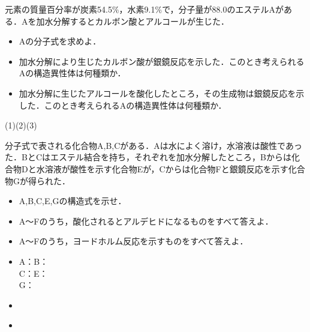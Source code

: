 \documentclass[a4paper,12pt]{ltjsreport}
\begin{document}
\newpage
\begin{que}
元素の質量百分率が炭素54.5$\%$，水素9.1$\%$で，分子量が88.0のエステルAがある．Aを加水分解するとカルボン酸とアルコールが生じた．
\begin{itemize}
    \item[(1)]Aの分子式を求めよ．
    \item [(2)]加水分解により生じたカルボン酸が銀鏡反応を示した．このとき考えられるAの構造異性体は何種類か．
    \item [(3)]加水分解に生じたアルコールを酸化したところ，その生成物は銀鏡反応を示した．このとき考えられるAの構造異性体は何種類か．
\end{itemize}
\end{que}
\ans \noindent (1)\hspace{150pt}(2)\hspace{150pt}(3)
\newpage
\begin{que}
分子式で表される化合物A,B,Cがある．Aは水によく溶け，水溶液は酸性であった．BとCはエステル結合を持ち，それぞれを加水分解したところ，Bからは化合物Dと水溶液が酸性を示す化合物Eが，Cからは化合物Fと銀鏡反応を示す化合物Gが得られた．
\begin{itemize}
    \item [(1)]A,B,C,E,Gの構造式を示せ．
    \item [(2)]A〜Fのうち，酸化されるとアルデヒドになるものをすべて答えよ．
    \item [(3)]A〜Fのうち，ヨードホルム反応を示すものをすべて答えよ．
\end{itemize}
\end{que}
\begin{itemize}
    \item [(1)]A：\hspace{200pt}B：\\[80pt]
    C：\hspace{200pt}E：\\[80pt]
    G：\\[80pt]
    \item [(2)]　\\[15pt]
    \item [(3)]
\end{itemize}
\end{document}
